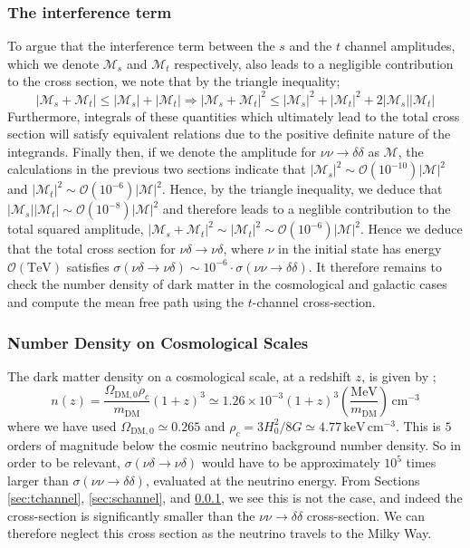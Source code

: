 \documentclass[11pt]{article}
\numberwithin{equation}{section}
\numberwithin{figure}{section}
\numberwithin{table}{section}
\newcommand{\mO}{\mathcal{O}}
\newcommand{\mM}{\mathcal{M}}
\newcommand{\Abs}[1]{\left| #1 \right|}
\begin{document}
\subsubsection{The interference term}\label{sec:interference}
To argue that the interference term between the $s$ and the $t$ channel amplitudes, which we denote $\mM_s$ and $\mM_t$ respectively, also leads to a negligible contribution to the cross section, we note that by the triangle inequality;
\begin{equation}
    \Abs{\mM_s + \mM_t} \leq \Abs{\mM_s} + \Abs{\mM_t} \Rightarrow \Abs{\mM_s + \mM_t}^2 \leq \Abs{\mM_s}^2 + \Abs{\mM_t}^2 + 2\Abs{\mM_s}\Abs{\mM_t}
\end{equation}
Furthermore, integrals of these quantities which ultimately lead to the total cross section will satisfy equivalent relations due to the positive definite nature of the integrands. Finally then, if we denote the amplitude for $\nu\nu \rightarrow \delta\delta$ as $\mM$, the calculations in the previous two sections indicate that $\Abs{\mM_s}^2 \sim \mO(10^{-10})\Abs{\mM}^2$ and $\Abs{\mM_t}^2 \sim \mO(10^{-6})\Abs{\mM}^2$. Hence, by the triangle inequality, we deduce that $\Abs{\mM_s}\Abs{\mM_t} \sim \mO(10^{-8})\Abs{\mM}^2$ and therefore leads to a neglible contribution to the total squared amplitude, $\Abs{\mM_s + \mM_t}^2 \sim \Abs{\mM_t}^2 \sim \mO(10^{-6})\Abs{\mM}^2$. Hence we deduce that the total cross section for $\nu\delta \rightarrow \nu\delta$, where $\nu$ in the initial state has energy $\mO(\mathrm{TeV})$ satisfies $\sigma(\nu\delta \rightarrow \nu\delta) \sim 10^{-6} \cdot \sigma(\nu\nu\rightarrow \delta\delta)$. It therefore remains to check the number density of dark matter in the cosmological and galactic cases and compute the mean free path using the $t$-channel cross-section.

\subsubsection{Number Density on Cosmological Scales}
The dark matter density on a cosmological scale, at a redshift $z$, is given by \cite{Farzan2014};
\begin{equation}
  n(z) = \frac{\Omega_{\textrm{DM},0}\rho_c}{m_{\textrm{DM}}}(1 + z)^3 \simeq 1.26 \times 10^{-3} (1 + z)^3 \left(\frac{\textrm{MeV}}{m_{\textrm{DM}}}\right) \, \textrm{cm}^{-3}
\end{equation}
where we have used $\Omega_{\textrm{DM},0} \simeq 0.265$ and $\rho_c = 3H_0^2/8G \simeq 4.77\, \textrm{keV}\,\textrm{cm}^{-3}$. This is $5$ orders of magnitude below the cosmic neutrino background number density. So in order to be relevant, $\sigma(\nu\delta \rightarrow \nu\delta)$ would have to be approximately $10^5$ times larger than $\sigma(\nu\nu \rightarrow \delta\delta)$, evaluated at the neutrino energy. From Sections \ref{sec:tchannel}, \ref{sec:schannel}, and \ref{sec:interference}, we see this is not the case, and indeed the cross-section is significantly smaller than the $\nu\nu \rightarrow \delta\delta$ cross-section.  We can therefore neglect this cross section as the neutrino travels to the Milky Way.
\end{document}
